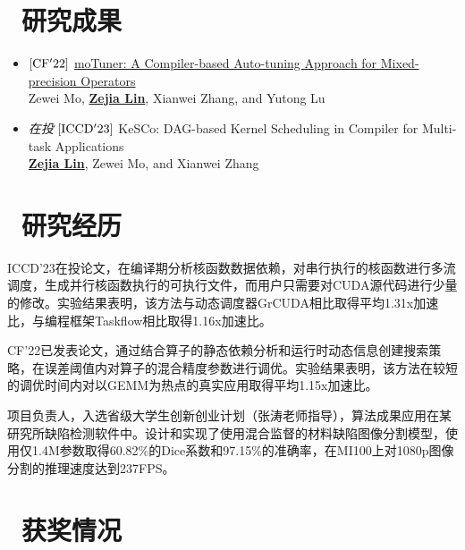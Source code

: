 \documentclass{resume}
\begin{document}
\vspace*{1em}

\section{\faBook\ 研究成果}

\begin{itemize}[parsep=0.5ex]
  \item $\rm{[CF'22]}$ \href{https://dl.acm.org/doi/10.1145/3528416.3530231}{moTuner: A Compiler-based Auto-tuning Approach for Mixed-precision Operators} \\ Zewei Mo, \underline{\textbf{Zejia Lin}}, Xianwei Zhang, and Yutong Lu
  \item \textit{在投} $[\rm{ICCD'23}]$ KeSCo: DAG-based Kernel Scheduling in Compiler for Multi-task Applications \\ \underline{\textbf{Zejia Lin}}, Zewei Mo, and Xianwei Zhang
\end{itemize}

\section{\faSearch\ 研究经历}

ICCD'23在投论文，在编译期分析核函数数据依赖，对串行执行的核函数进行多流调度，生成并行核函数执行的可执行文件，而用户只需要对CUDA源代码进行少量的修改。实验结果表明，该方法与动态调度器GrCUDA相比取得平均1.31x加速比，与编程框架Taskflow相比取得1.16x加速比。


\vspace*{0.3em}
CF'22已发表论文，通过结合算子的静态依赖分析和运行时动态信息创建搜索策略，在误差阈值内对算子的混合精度参数进行调优。实验结果表明，该方法在较短的调优时间内对以GEMM为热点的真实应用取得平均1.15x加速比。


\vspace*{0.3em}
项目负责人，入选省级大学生创新创业计划（张涛老师指导），算法成果应用在某研究所缺陷检测软件中。设计和实现了使用混合监督的材料缺陷图像分割模型，使用仅1.4M参数取得60.82\%的Dice系数和97.15\%的准确率，在MI100上对1080p图像分割的推理速度达到237FPS。

\section{\faRocket\ 获奖情况}
\end{document}
